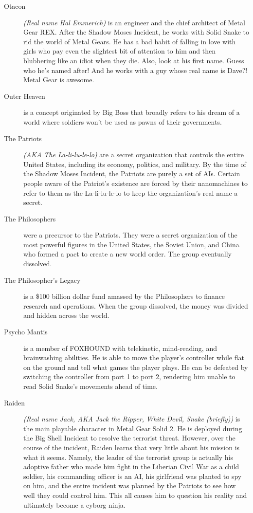 \documentclass[12pt]{article}
\begin{document}
\begin{description}
	\item [Otacon] \textit{(Real name Hal Emmerich)} is an engineer and the
		chief architect of Metal Gear REX. After the Shadow Moses
		Incident, he works with Solid Snake to rid the world of Metal
		Gears. He has a bad habit of falling in love with girls who pay
		even the slightest bit of attention to him and then blubbering
		like an idiot when they die. Also, look at his first name. Guess
		who he's named after! And he works with a guy whose real name
		is Dave?! Metal Gear is awesome.

	\item [Outer Heaven] is a concept originated by Big Boss that broadly
		refers to his dream of a world where soldiers won't be used as
		pawns of their governments.

	\item [The Patriots] \textit{(AKA The La-li-lu-le-lo)} are a secret
		organization that controls the entire United States, including
		its economy, politics, and military. By the time of the Shadow
		Moses Incident, the Patriots are purely a set of AIs. Certain
		people aware of the Patriot's existence are forced by their
		nanomachines to refer to them as the La-li-lu-le-lo to keep the
		organization's real name a secret.

	\item [The Philosophers] were a precursor to the Patriots. They were a
		secret organization of the most powerful figures in the United
		States, the Soviet Union, and China who formed a pact to create
		a new world order. The group eventually dissolved.

	\item [The Philosopher's Legacy] is a \$100 billion dollar fund amassed
		by the Philosophers to finance research and operations. When
		the group dissolved, the money was divided and hidden across
		the world.

	\item [Psycho Mantis] is a member of FOXHOUND with telekinetic,
		mind-reading, and brainwashing abilities. He is able to move
		the player's controller while flat on the ground and tell what
		games the player plays. He can be defeated by switching the
		controller from port 1 to port 2, rendering him unable to read
		Solid Snake's movements ahead of time.

	\item [Raiden] \textit{(Real name Jack, AKA Jack the Ripper, White
		Devil, Snake (briefly))} is the main playable character in
		Metal Gear Solid 2. He is deployed during the Big Shell
		Incident to resolve the terrorist threat. However, over the
		course of the incident, Raiden learns that very little about
		his mission is what it seems. Namely, the leader of the
		terrorist group is actually his adoptive father who made him
		fight in the Liberian Civil War as a child soldier, his
		commanding officer is an AI, his girlfriend was planted to spy
		on him, and the entire incident was planned by the Patriots to
		see how well they could control him. This all causes him to
		question his reality and ultimately become a cyborg ninja.


\end{description}
\end{document}
